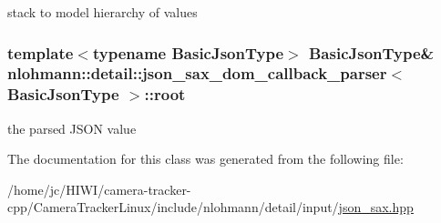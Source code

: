 stack to model hierarchy of values 

\subsubsection[{\texorpdfstring{root}{root}}]{\setlength{\rightskip}{0pt plus 5cm}template$<$typename Basic\+Json\+Type$>$ Basic\+Json\+Type\& {\bf nlohmann\+::detail\+::json\+\_\+sax\+\_\+dom\+\_\+callback\+\_\+parser}$<$ Basic\+Json\+Type $>$\+::root\hspace{0.3cm}{\ttfamily [private]}}\hypertarget{classnlohmann_1_1detail_1_1json__sax__dom__callback__parser_a7b12037ca38be3ddec09c42bd71080cc}{}\label{classnlohmann_1_1detail_1_1json__sax__dom__callback__parser_a7b12037ca38be3ddec09c42bd71080cc}


the parsed J\+S\+ON value 



The documentation for this class was generated from the following file\+:\begin{DoxyCompactItemize}
\item 
/home/jc/\+H\+I\+W\+I/camera-\/tracker-\/cpp/\+Camera\+Tracker\+Linux/include/nlohmann/detail/input/\hyperlink{json__sax_8hpp}{json\+\_\+sax.\+hpp}\end{DoxyCompactItemize}
